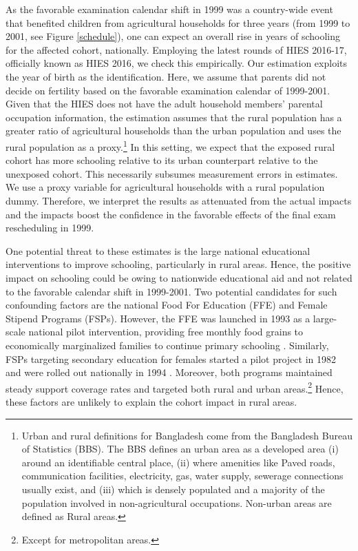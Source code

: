 \documentclass[12pt,letterpaper]{article}\usepackage[margin=1in]{geometry}
\newcommand{\0}{\ensuremath{\mbox{\boldmath $0$}}}
\begin{document}
As the favorable examination calendar shift in 1999 was a country-wide event that benefited children from agricultural households for three years (from 1999 to 2001, see Figure \ref{schedule}), one can expect an overall rise in years of schooling for the affected cohort, nationally. Employing the latest rounds of HIES 2016-17, officially known as HIES 2016, we check this empirically. Our estimation exploits the year of birth as the identification. Here, we assume that parents did not decide on fertility based on the favorable examination calendar of 1999-2001. Given that the HIES does not have the adult household members' parental occupation information, the estimation assumes that the rural population has a greater ratio of agricultural households than the urban population and uses the rural population as a proxy.\footnote{Urban and rural definitions for Bangladesh come from the Bangladesh Bureau of Statistics (BBS). The BBS defines an urban area as a developed area (i) around an identifiable central place, (ii) where amenities like Paved roads, communication facilities, electricity, gas, water supply, sewerage connections usually exist, and (iii) which is densely populated and a majority of the population involved in non-agricultural occupations. Non-urban areas are defined as Rural areas.} In this setting, we expect that the exposed rural cohort has more schooling relative to its urban counterpart relative to the unexposed cohort. This necessarily subsumes measurement errors in estimates. We use a proxy variable for agricultural households with a rural population dummy. Therefore, we interpret the results as attenuated from the actual impacts and the impacts boost the confidence in the favorable effects of the final exam rescheduling in 1999.

One potential threat to these estimates is the large national educational interventions to improve schooling, particularly in rural areas. Hence, the positive impact on schooling could be owing to nationwide educational aid and not related to the favorable calendar shift in 1999-2001. Two potential candidates for such confounding factors are the national Food For Education (FFE) and Female Stipend Programs (FSPs). However, the FFE was launched in 1993 as a large-scale national pilot intervention, providing free monthly food grains to economically marginalized families to continue primary schooling  \citep{ahmed2002food}. Similarly, FSPs targeting secondary education for females started a pilot project in 1982 and were rolled out nationally in 1994  \citep{xu2022assessing}. Moreover, both programs maintained steady support coverage rates and targeted both rural and urban areas.\footnote{Except for metropolitan areas.} Hence, these factors are unlikely to explain the cohort impact in rural areas. 
\end{document}
